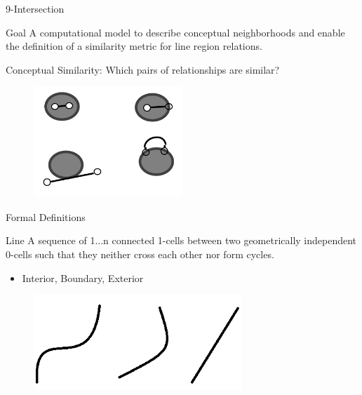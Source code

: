 

\begin{frame}{9-Intersection}
	\begin{block}{Goal} 
	A computational model to describe conceptual neighborhoods and enable the definition of a similarity metric for line region relations.
		\end{block}
	\begin{block}{Conceptual Similarity: Which pairs of relationships are similar?}
	\begin{figure}
	\includegraphics[width = 0.5\textwidth]{images/conceptualsimilarity.png}
	\end{figure}
\end{block}			
\end{frame}

\begin{frame}{Formal Definitions}
	\begin{block}{Line}
	A sequence of 1...n connected 1-cells between two geometrically independent 0-cells such that they neither cross each other nor form cycles.
	\begin{itemize}
	\item Interior, Boundary, Exterior
	\end{itemize}
\end{block}		
		\begin{figure}
		\includegraphics[width=0.7\textwidth]{images/line.png}
\end{figure}
\end{frame}

